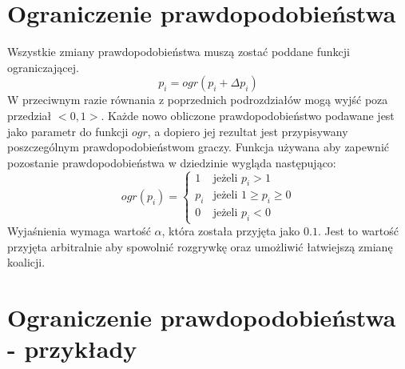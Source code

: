 
\section{Ograniczenie prawdopodobieństwa}
\label{sec:ograniczenie}
Wszystkie zmiany prawdopodobieństwa muszą zostać poddane funkcji ograniczającej.
\begin{equation} \label{eq:ograniczenie}
p_i = ogr( p_i + \Delta p_i)
\end{equation}
W przeciwnym razie równania z poprzednich podrozdziałów mogą wyjść poza przedział $<0,1>$. Każde nowo obliczone prawdopodobieństwo podawane jest jako parametr do funkcji $ogr$, a dopiero jej rezultat jest przypisywany poszczególnym prawdopodobieństwom graczy. Funkcja używana aby zapewnić pozostanie prawdopodobieństwa w dziedzinie wygląda następująco:
\begin{displaymath}
ogr(p_i) = \left\{
\begin{array}{ll}
1 & \text{jeżeli } p_i > 1 \\
p_i & \text{jeżeli } 1 \geq p_i \geq 0 \\
0 & \text{jeżeli } p_i < 0
\end{array} 
\right.
\end{displaymath}
Wyjaśnienia wymaga wartość $\alpha$, która została przyjęta jako $0.1$. Jest to wartość przyjęta arbitralnie aby spowolnić rozgrywkę oraz umożliwić łatwiejszą zmianę koalicji. 


\section{Ograniczenie prawdopodobieństwa - przykłady}
\label{sec:ograniczenie_przyk}
